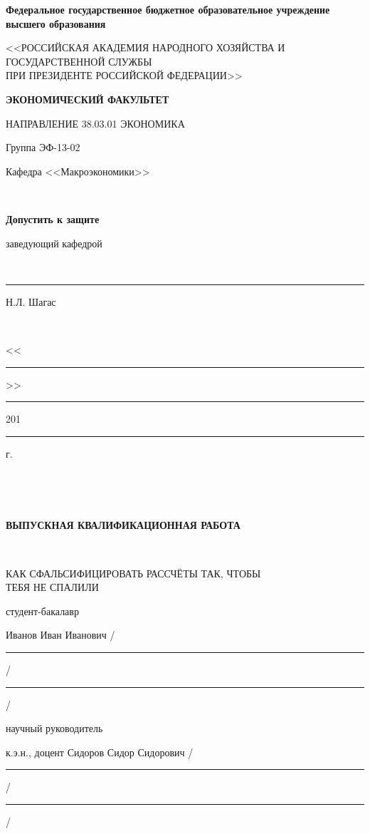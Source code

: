 \documentclass[14pt,a4paper, oneside]{extreport}
\begin{document}
\pagestyle{fancy}

\thispagestyle{empty}

\renewcommand{\headrulewidth}{0pt}

\begin{center}
\small \bfseries Федеральное государственное бюджетное образовательное учреждение высшего образования \vspace{2ex} 

 
<<РОССИЙСКАЯ АКАДЕМИЯ НАРОДНОГО ХОЗЯЙСТВА И\\ ГОСУДАРСТВЕННОЙ СЛУЖБЫ \\
ПРИ ПРЕЗИДЕНТЕ РОССИЙСКОЙ ФЕДЕРАЦИИ>>

\vspace{2ex}

\bfseries
ЭКОНОМИЧЕСКИЙ ФАКУЛЬТЕТ

НАПРАВЛЕНИЕ 38.03.01 ЭКОНОМИКА
\end{center}

\vfill


\noindent\small Группа ЭФ-13-02
\hfill
\parbox[t]{20em}{\centering\small
Кафедра <<Макроэкономики>>

\mbox{ }

\textbf{Допустить к защите}

заведующий кафедрой

\mbox{ }

\rule{8em}{0.5pt} Н.Л. Шагас

\mbox{ }

<<\rule{2em}{0.5pt}>> \rule{5em}{0.5pt} 201\rule{1em}{0.5pt} г. }

\mbox{ }

\mbox{ }

\begin{center}\bfseries
ВЫПУСКНАЯ КВАЛИФИКАЦИОННАЯ РАБОТА

\mbox{ }

\large
КАК СФАЛЬСИФИЦИРОВАТЬ РАССЧЁТЫ ТАК, ЧТОБЫ \\
ТЕБЯ НЕ СПАЛИЛИ 
\end{center}

\vfill

\noindent\normalsize
студент-бакалавр

\noindent
Иванов Иван Иванович 
\hfill /\rule{6em}{0.5pt}/\rule{6em}{0.5pt}/

\hfill{}

\noindent
научный руководитель


\noindent
к.э.н., доцент Сидоров Сидор Сидорович 
\hfill /\rule{6em}{0.5pt}/\rule{6em}{0.5pt}/
\end{document}
